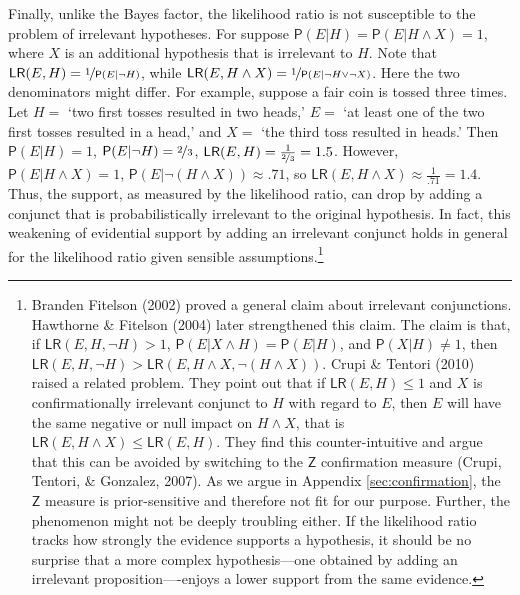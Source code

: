 \documentclass[
  10pt,
  dvipsnames,enabledeprecatedfontcommands]{scrartcl}
\newcommand{\n}{\neg}
\newcommand{\et}{\wedge}
\newcommand{\pr}[1]{\mathsf{P}(#1)}
\begin{document}
Finally, unlike the Bayes factor, the likelihood ratio is not
susceptible to the problem of irrelevant hypotheses. For suppose
\(\pr{E\vert H} = \pr{E\vert H \et X} = 1\), where \(X\) is an
additional hypothesis that is irrelevant to \(H\). Note that
\(\mathsf{LR}(E,H) = \nicefrac{1}{\pr{E \vert \n H}}\), while
\(\mathsf{LR}(E, H \et X) = \nicefrac{1}{\pr{E \vert \n H \vee \n X}}\).
Here the two denominators might differ. For example, suppose a fair coin
is tossed three times. Let \(H=\) `two first tosses resulted in two
heads,' \(E=\) `at least one of the two first tosses resulted in a
head,' and \(X=\) `the third toss resulted in heads.' Then
\(\pr{E \vert H} =1\), \(\pr{E\vert \n H} = \nicefrac{2}{3}\),
\(\mathsf{LR}(E,H) = \frac{1}{\nicefrac{2}{3}} = 1.5\). However,
\(\pr{E\vert H \et X} =1\), \(\pr{E \vert \n (H \et X)} \approx .71\),
so \(\mathsf{LR}(E,H \et X) \approx \frac{1}{.71} = 1.4\). Thus, the
support, as measured by the likelihood ratio, can drop by adding a
conjunct that is probabilistically irrelevant to the original
hypothesis. In fact, this weakening of evidential support by adding an
irrelevant conjunct holds in general for the likelihood ratio given
sensible assumptions.\footnote{Branden Fitelson (2002) proved a general
  claim about irrelevant conjunctions. Hawthorne \& Fitelson (2004)
  later strengthened this claim. The claim is that, if
  \(\mathsf{LR}(E,H,\n H)>1\),
  \(\pr{E \vert X \et H} = \pr{E \vert H}\), and
  \(\pr{X \vert H} \neq 1\), then
  \(\mathsf{LR}(E,H,\n H) > \mathsf{LR}(E,H \et X,\n(H \et X))\). Crupi
  \& Tentori (2010) raised a related problem. They point out that if
  \(\mathsf{LR}(E,H)\leq 1\) and \(X\) is confirmationally irrelevant
  conjunct to \(H\) with regard to \(E\), then \(E\) will have the same
  negative or null impact on \(H \et X\), that is
  \(\mathsf{LR}(E,H \et X ) \leq \mathsf{LR}(E,H)\). They find this
  counter-intuitive and argue that this can be avoided by switching to
  the \(\mathsf{Z}\) confirmation measure (Crupi, Tentori, \& Gonzalez,
  2007). As we argue in Appendix \ref{sec:confirmation}, the
  \(\mathsf{Z}\) measure is prior-sensitive and therefore not fit for
  our purpose. Further, the phenomenon might not be deeply troubling
  either. If the likelihood ratio tracks how strongly the evidence
  supports a hypothesis, it should be no surprise that a more complex
  hypothesis---one obtained by adding an irrelevant
  proposition----enjoys a lower support from the same evidence.}

\vspace{1mm}
\footnotesize
\end{document}
